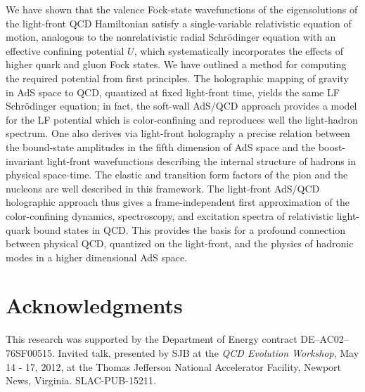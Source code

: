 \documentclass[prd,aps,onecolumn,nofootinbib]{revtex4}
\begin{document}
We have shown that the valence Fock-state wavefunctions of the eigensolutions of the light-front QCD Hamiltonian satisfy a single-variable relativistic equation of motion, analogous to the nonrelativistic radial Schr\"odinger equation with an effective 
confining potential $U$, which systematically incorporates the effects of higher quark and gluon Fock states.   We have outlined a method for computing the required potential from first principles. 
The holographic mapping of gravity in AdS space to QCD, quantized at fixed light-front time, yields the same LF Schr\"odinger equation;  in fact,  
the soft-wall  AdS/QCD approach  provides  a model for the LF potential which is color-confining and reproduces well the light-hadron spectrum.  One also derives via light-front holography a precise relation between the bound-state amplitudes in the fifth dimension of AdS space and the boost-invariant light-front wavefunctions describing the internal structure of hadrons in physical space-time.   
The elastic and transition form factors of the pion and the nucleons are well described in this framework.  
The light-front AdS/QCD  holographic approach thus gives  a frame-independent first approximation of the color-confining dynamics,  spectroscopy, and excitation spectra of relativistic light-quark bound states in QCD.    This provides  the basis for a profound connection between physical QCD, quantized on the light-front, and the physics of hadronic modes in a higher dimensional AdS space.







\section*{Acknowledgments}

\vspace{5pt}

This research was supported by the Department of Energy contract DE--AC02--76SF00515.
Invited talk, presented by SJB at the {\it QCD Evolution Workshop},
May 14 - 17, 2012, at the 
Thomas Jefferson National Accelerator Facility,
Newport News, Virginia. 
SLAC-PUB-15211.
\end{document}
